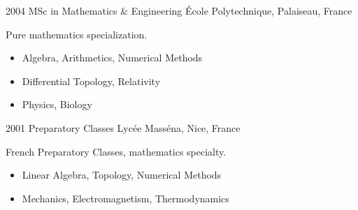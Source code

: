 \documentclass[12pt]{friggeri-cv}
\begin{document}
\begin{entrylist}
  \entry
    {2004}
    {MSc in Mathematics \& Engineering}
    {\'{E}cole Polytechnique, Palaiseau, France}
    {Pure mathematics specialization.
    \begin{itemize}
        \item Algebra, Arithmetics, Numerical Methods
        \item Differential Topology, Relativity
        \item Physics, Biology
    \end{itemize}
    }

  \entry
    {2001}
    {Preparatory Classes}
    {Lyc\'{e}e Mass\'{e}na, Nice, France}
    {French Preparatory Classes, mathematics specialty.
    \begin{itemize}
        \item Linear Algebra, Topology, Numerical Methods
        \item Mechanics, Electromagnetism, Thermodynamics
    \end{itemize}
    }
\end{entrylist}







\newpage
\end{document}
